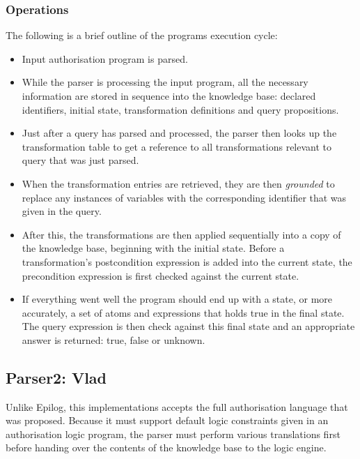 \documentclass[a4paper,draft]{article}
\begin{document}
      \subsubsection{Operations}

        The following is a brief outline of the programs execution cycle:

        \begin{itemize}
          \item
            Input authorisation program is parsed.
          \item
            While the parser is processing the input program, all the
            necessary information are stored in sequence into the knowledge
            base: declared identifiers, initial state, transformation
            definitions and query propositions.
          \item
            Just after a query has parsed and processed, the parser then
            looks up the transformation table to get a reference to all
            transformations relevant to query that was just parsed.
          \item
            When the transformation entries are retrieved, they are then
            \emph{grounded} to replace any instances of variables with
            the corresponding identifier that was given in the query.
          \item
            After this, the transformations are then applied sequentially
            into a copy of the knowledge base, beginning with the initial
            state. Before a transformation's postcondition expression is added
            into the current state, the precondition expression is first
            checked against the current state.
          \item
            If everything went well the program should end up with a state,
            or more accurately, a set of atoms and expressions that holds
            true in the final state. The query expression is then check
            against this final state and an appropriate answer is returned:
            true, false or unknown.
            
        \end{itemize}

    \subsection{Parser2: Vlad}

      Unlike Epilog, this implementations accepts the full authorisation
      language that was proposed. Because it must support default logic
      constraints given in an authorisation logic program, the parser must
      perform various translations first before handing over the contents
      of the knowledge base to the logic engine.
\end{document}
